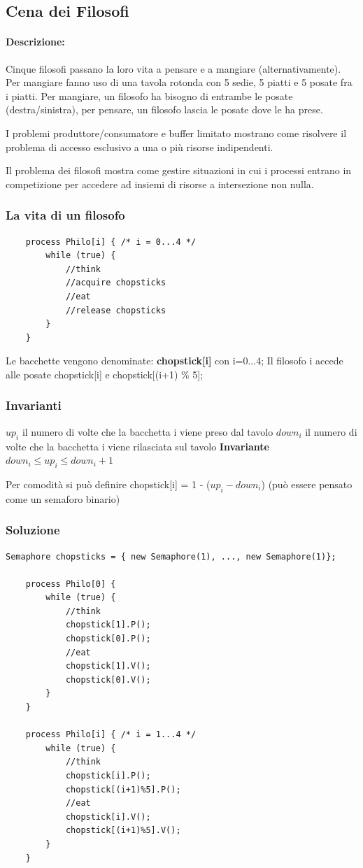 \subsection{Cena dei Filosofi}
\paragraph{Descrizione:}Cinque filosofi passano la loro vita a pensare e a mangiare (alternativamente).
Per mangiare fanno uso di una tavola rotonda con 5 sedie, 5 piatti e 5 posate fra i piatti.
Per mangiare, un filosofo ha bisogno di entrambe le posate (destra/sinistra), per pensare, un filosofo lascia le posate
dove le ha prese.

I problemi produttore/consumatore e buffer limitato mostrano come risolvere il problema di accesso esclusivo a una o più
risorse indipendenti.

Il problema dei filosofi mostra come gestire situazioni in cui i processi entrano in competizione per accedere ad insiemi di risorse a intersezione non nulla.

\subsubsection{La vita di un filosofo}
\begin{lstlisting}
    process Philo[i] { /* i = 0...4 */
        while (true) {
            //think
            //acquire chopsticks
            //eat
            //release chopsticks
        }
    }
\end{lstlisting}        

Le bacchette vengono denominate: \textbf{chopstick[i]} con i=0...4;
Il filosofo i accede alle posate chopstick[i] e chopstick[(i+1) \% 5];
\subsubsection{Invarianti}
$up_i$ il numero di volte che la bacchetta i viene preso dal tavolo
$down_i$ il numero di volte che la bacchetta i viene rilasciata sul tavolo
\newpage
\textbf{Invariante}
$down_i \leq up_i \leq down_i + 1$

Per comodità si può definire chopstick[i] = 1 - ($up_i-down_i$)
(può essere pensato come un semaforo binario)

\subsubsection{Soluzione}
\begin{lstlisting}
Semaphore chopsticks = { new Semaphore(1), ..., new Semaphore(1)};

    process Philo[0] {
        while (true) {
            //think
            chopstick[1].P();
            chopstick[0].P();
            //eat
            chopstick[1].V();
            chopstick[0].V();
        }
    }

    process Philo[i] { /* i = 1...4 */
        while (true) {
            //think
            chopstick[i].P();
            chopstick[(i+1)%5].P();
            //eat
            chopstick[i].V();
            chopstick[(i+1)%5].V();
        }
    }
\end{lstlisting}

